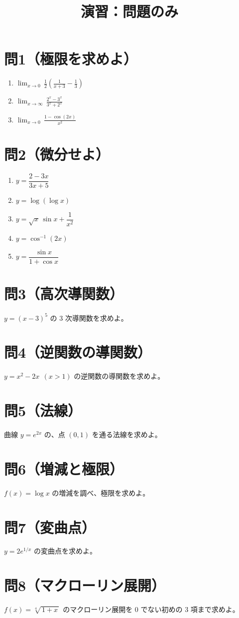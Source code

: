 \documentclass[12pt]{article}
\title{演習：問題のみ}
\author{}
\date{}
\begin{document}
\maketitle

\section*{問1（極限を求めよ）}
\begin{enumerate}
  \item $\displaystyle \lim_{x\to0}\,\frac{1}{2}\!\left(\frac{1}{x+3}-\frac{1}{3}\right)$
  \item $\displaystyle \lim_{x\to\infty}\,\frac{2^{x}-3^{x}}{3^{x}+2^{x}}$
  \item $\displaystyle \lim_{x\to0}\,\frac{1-\cos(2x)}{x^{2}}$
\end{enumerate}

\section*{問2（微分せよ）}
\begin{enumerate}
  \item $y=\dfrac{2-3x}{3x+5}$
  \item $y=\log(\log x)$
  \item $y=\sqrt{x}\,\sin x+\dfrac{1}{x^{2}}$
  \item $y=\cos^{-1}(2x)$
  \item $y=\dfrac{\sin x}{1+\cos x}$
\end{enumerate}

\section*{問3（高次導関数）}
$y=(x-3)^{5}$ の $3$ 次導関数を求めよ。

\section*{問4（逆関数の導関数）}
$y=x^{2}-2x\ \ (x>1)$ の逆関数の導関数を求めよ。

\section*{問5（法線）}
曲線 $y=e^{2x}$ の、点 $(0,1)$ を通る法線を求めよ。

\section*{問6（増減と極限）}
$f(x)=\log x$ の増減を調べ、極限を求めよ。

\section*{問7（変曲点）}
$y=2e^{1/x}$ の変曲点を求めよ。

\section*{問8（マクローリン展開）}
$f(x)=\sqrt[4]{\,1+x\,}$ のマクローリン展開を $0$ でない初めの $3$ 項まで求めよ。
\end{document}
